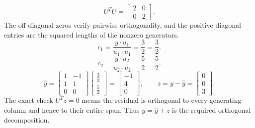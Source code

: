 \[U^TU=\left[\begin{array}{rr}2&0\\0&2\end{array}\right].\]
The off-diagonal zeros verify pairwise orthogonality, and the positive diagonal entries are the squared lengths of the nonzero generators.
\[c_{1}=\frac{y\cdot u_{1}}{u_{1}\cdot u_{1}}=\frac{3}{2}=\frac{3}{2}.\]
\[c_{2}=\frac{y\cdot u_{2}}{u_{2}\cdot u_{2}}=\frac{5}{2}=\frac{5}{2}.\]
\[\widehat y=\left[\begin{array}{rr}1&-1\\1&1\\0&0\end{array}\right]\left[\begin{array}{r}\frac{3}{2}\\\frac{5}{2}\end{array}\right]=\left[\begin{array}{r}-1\\4\\0\end{array}\right],\qquad z=y-\widehat y=\left[\begin{array}{r}0\\0\\3\end{array}\right].\]
The exact check $U^Tz=0$ means the residual is orthogonal to every generating column and hence to their entire span. Thus $y=\widehat y+z$ is the required orthogonal decomposition.



